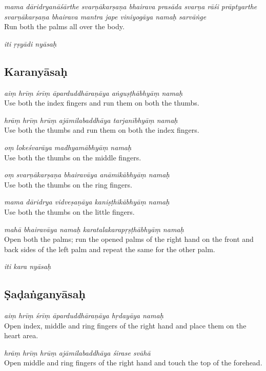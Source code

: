\documentclass[11pt,oneside,a4paper]{article}
\newenvironment{shloka}[1]
  {\bigskip\center#1\varwidth{\linewidth}}
  {\endvarwidth\endcenter\bigskip}
\newcommand{\tl}[1]{\emph{#1}}
\begin{document}
\tl{mama dāridryanāśārthe svarṇākarṣaṇa
bhairava prasāda svarṇa rāśi prāptyarthe svarṇākarṣaṇa bhairava mantra jape
viniyogāya namaḥ sarvāṅge}\\
Run both the palms all over the body.

\begin{shloka}\itshape
  iti ṛṣyādi nyāsaḥ
\end{shloka}

\subsection{Karanyāsaḥ}

\tl{aiṃ hrīṃ śrīṃ āparduddhāraṇāya aṅguṣṭhābhyāṃ namaḥ}\\
Use both the index fingers and run them on both the thumbs.

\tl{hrāṃ hrīṃ hrūṃ ajāmilabaddhāya tarjanībhyāṃ namaḥ}\\
Use both the thumbs and run them on both the index fingers.

\tl{oṃ lokeśvarāya madhyamābhyāṃ namaḥ}\\
Use both the thumbs on the middle fingers.

\tl{oṃ svarṇākarṣaṇa bhairavāya anāmikābhyāṃ namaḥ}\\
Use both the thumbs on the ring fingers.

\tl{mama dāridrya vidveṣaṇāya kaniṣṭhikābhyāṃ namaḥ}\\
Use both the thumbs on the little fingers.

\tl{mahā bhairavāya namaḥ karatalakarapṛṣṭhābhyāṃ namaḥ}\\
Open both the palms; run the opened palms of the right hand on the front and
back sides of the left palm and repeat the same for the other palm.

\begin{shloka}\itshape
  iti kara nyāsaḥ
\end{shloka}

\subsection{Ṣaḍaṅganyāsaḥ}

\tl{aiṃ hrīṃ śrīṃ āparduddhāraṇāya hṛdayāya namaḥ}\\
Open index, middle and ring fingers of the right hand and place them on
the heart area.

\tl{hrāṃ hrīṃ hrūṃ ajāmilabaddhāya śirase svāhā}\\
Open middle and ring fingers of the right hand and touch the top of
the forehead.
\end{document}
